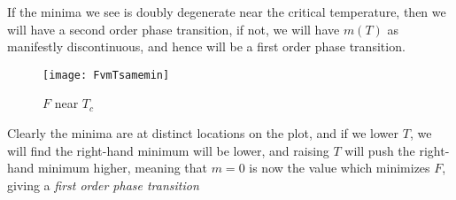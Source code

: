 If the minima we see is doubly degenerate near the critical temperature, then we will have a second order phase transition, if not, we will have $m(T)$ as manifestly discontinuous, and hence will be a first order phase transition.
\begin{figure}[H]
  \centering
  \texttt{[image: FvmTsamemin]}
  \caption{$F$ near $T_c$}
\end{figure}
Clearly the minima are at distinct locations on the plot, and if we lower $T$, we will find the right-hand minimum will be lower, and raising $T$ will push the right-hand minimum higher, meaning that $m=0$ is now the value which minimizes $F$, giving a \emph{first order phase transition}
